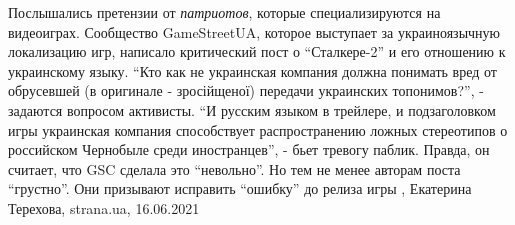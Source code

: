 Послышались претензии от \emph{патриотов}, которые специализируются на видеоиграх.
Сообщество GameStreetUA, которое выступает за украиноязычную локализацию игр,
написало критический пост о \enquote{Сталкере-2} и его отношению к украинскому
языку. \enquote{Кто как не украинская компания должна понимать вред от
обрусевшей (в оригинале - зросійщеної) передачи украинских топонимов?}, -
задаются вопросом активисты. \enquote{И русским языком в трейлере, и
подзаголовком игры украинская компания способствует распространению ложных
стереотипов о российском Чернобыле среди иностранцев}, - бьет тревогу паблик.
Правда, он считает, что GSC сделала это \enquote{невольно}. Но тем не менее
авторам поста \enquote{грустно}. Они призывают исправить \enquote{ошибку} до
релиза игры
, 
Екатерина Терехова, strana.ua, 16.06.2021

